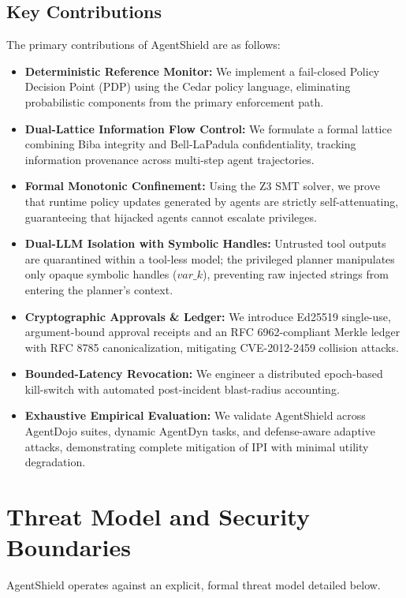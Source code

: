 \documentclass[conference]{IEEEtran}
\begin{document}
\subsection{Key Contributions}
The primary contributions of AgentShield are as follows:
\begin{itemize}
    \item \textbf{Deterministic Reference Monitor:} We implement a fail-closed Policy Decision Point (PDP) using the Cedar policy language, eliminating probabilistic components from the primary enforcement path.
    \item \textbf{Dual-Lattice Information Flow Control:} We formulate a formal lattice combining Biba integrity and Bell-LaPadula confidentiality, tracking information provenance across multi-step agent trajectories.
    \item \textbf{Formal Monotonic Confinement:} Using the Z3 SMT solver, we prove that runtime policy updates generated by agents are strictly self-attenuating, guaranteeing that hijacked agents cannot escalate privileges.
    \item \textbf{Dual-LLM Isolation with Symbolic Handles:} Untrusted tool outputs are quarantined within a tool-less model; the privileged planner manipulates only opaque symbolic handles ($var\_k$), preventing raw injected strings from entering the planner's context.
    \item \textbf{Cryptographic Approvals \& Ledger:} We introduce Ed25519 single-use, argument-bound approval receipts and an RFC 6962-compliant Merkle ledger with RFC 8785 canonicalization, mitigating CVE-2012-2459 collision attacks.
    \item \textbf{Bounded-Latency Revocation:} We engineer a distributed epoch-based kill-switch with automated post-incident blast-radius accounting.
    \item \textbf{Exhaustive Empirical Evaluation:} We validate AgentShield across AgentDojo suites, dynamic AgentDyn tasks, and defense-aware adaptive attacks, demonstrating complete mitigation of IPI with minimal utility degradation.
\end{itemize}

\section{Threat Model and Security Boundaries}
\label{sec:threat_model}

AgentShield operates against an explicit, formal threat model detailed below.
\end{document}
